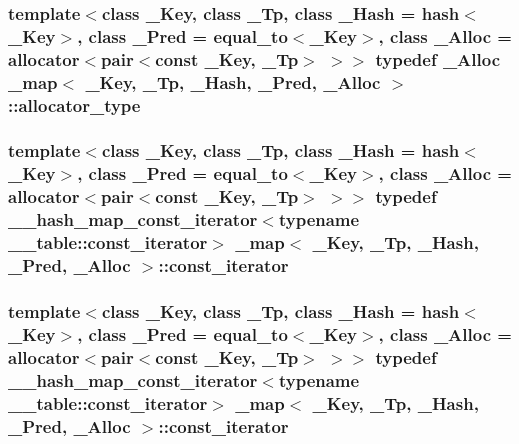 \subsubsection[{allocator\+\_\+type}]{\setlength{\rightskip}{0pt plus 5cm}template$<$class \+\_\+\+Key, class \+\_\+\+Tp, class \+\_\+\+Hash = hash$<$\+\_\+\+Key$>$, class \+\_\+\+Pred = equal\+\_\+to$<$\+\_\+\+Key$>$, class \+\_\+\+Alloc = allocator$<$pair$<$const \+\_\+\+Key, \+\_\+\+Tp$>$ $>$$>$ typedef \+\_\+\+Alloc {\bf \+\_\+map}$<$ \+\_\+\+Key, \+\_\+\+Tp, \+\_\+\+Hash, \+\_\+\+Pred, \+\_\+\+Alloc $>$\+::{\bf allocator\+\_\+type}}\label{class__map_ab38dd0bcf1867887afc2be61257ef025}
\hypertarget{class__map_ab0513968c2610ccf3b3fe070184396aa}{}
\subsubsection[{const\+\_\+iterator}]{\setlength{\rightskip}{0pt plus 5cm}template$<$class \+\_\+\+Key, class \+\_\+\+Tp, class \+\_\+\+Hash = hash$<$\+\_\+\+Key$>$, class \+\_\+\+Pred = equal\+\_\+to$<$\+\_\+\+Key$>$, class \+\_\+\+Alloc = allocator$<$pair$<$const \+\_\+\+Key, \+\_\+\+Tp$>$ $>$$>$ typedef {\bf \+\_\+\+\_\+hash\+\_\+map\+\_\+const\+\_\+iterator}$<$typename \+\_\+\+\_\+table\+::const\+\_\+iterator$>$ {\bf \+\_\+map}$<$ \+\_\+\+Key, \+\_\+\+Tp, \+\_\+\+Hash, \+\_\+\+Pred, \+\_\+\+Alloc $>$\+::{\bf const\+\_\+iterator}}\label{class__map_ab0513968c2610ccf3b3fe070184396aa}
\hypertarget{class__map_ab0513968c2610ccf3b3fe070184396aa}{}
\subsubsection[{const\+\_\+iterator}]{\setlength{\rightskip}{0pt plus 5cm}template$<$class \+\_\+\+Key, class \+\_\+\+Tp, class \+\_\+\+Hash = hash$<$\+\_\+\+Key$>$, class \+\_\+\+Pred = equal\+\_\+to$<$\+\_\+\+Key$>$, class \+\_\+\+Alloc = allocator$<$pair$<$const \+\_\+\+Key, \+\_\+\+Tp$>$ $>$$>$ typedef {\bf \+\_\+\+\_\+hash\+\_\+map\+\_\+const\+\_\+iterator}$<$typename \+\_\+\+\_\+table\+::const\+\_\+iterator$>$ {\bf \+\_\+map}$<$ \+\_\+\+Key, \+\_\+\+Tp, \+\_\+\+Hash, \+\_\+\+Pred, \+\_\+\+Alloc $>$\+::{\bf const\+\_\+iterator}}\label{class__map_ab0513968c2610ccf3b3fe070184396aa}
\hypertarget{class__map_aa447944b5b72b05cb3d909f7ac48d2d7}{}
